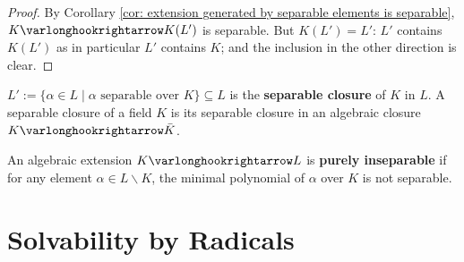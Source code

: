 \documentclass{article}
\begin{document}
\begin{proof}
    By Corollary \ref{cor: extension generated by separable elements is separable}, $K \ext K(L')$ is separable. But $K(L') = L'$: $L'$ contains $K(L')$ as in particular $L'$ contains $K$; and the inclusion in the other direction is clear.
\end{proof}

\begin{definition}
    $L' := \{ \alpha \in L \mid \alpha \text{ separable over $K$}\} \subseteq L$ is the \textbf{separable closure} of $K$ in $L$. A separable closure of a field $K$ is its separable closure in an algebraic closure $K \ext \bar{K}$.
\end{definition}
\nogap
\begin{definition}
    An algebraic extension $K \ext L$ is \textbf{purely inseparable} if for any element $\alpha \in L \smallsetminus K$, the minimal polynomial of $\alpha$ over $K$ is not separable. 
\end{definition}

\section{Solvability by Radicals}
\end{document}
